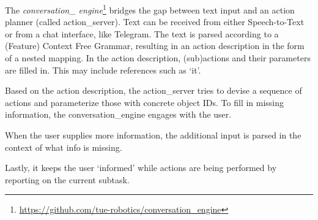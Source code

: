 \label{ssec:conversation}
The \emph{conversation\_ engine}\footnote{\url{https://github.com/tue-robotics/conversation_engine}} bridges the gap between text input and an action planner (called action\_server). 
Text can be received from either Speech-to-Text or from a chat interface, like Telegram\texttrademark\hspace{0em}.
The text is parsed according to a (Feature) Context Free Grammar, resulting in an action description in the form of a nested mapping. 
In the action description, (sub)actions and their parameters are filled in. 
This may include references such as `it'.

Based on the action description, the action\_server tries to devise a sequence of actions and parameterize those with concrete object IDs. 
To fill in missing information, the conversation\_engine engages with the user. 

When the user supplies more information, the additional input is parsed in the context of what info is missing.%

Lastly, it keeps the user `informed' while actions are being performed by reporting on the current subtask.
